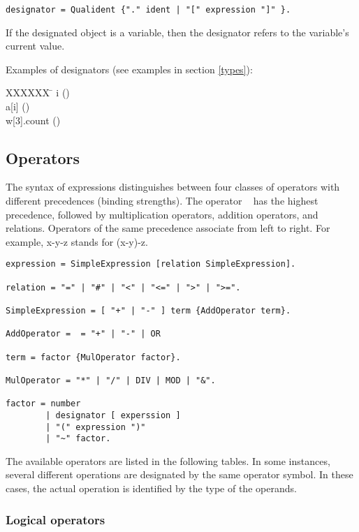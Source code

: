 \documentclass[12pt]{article}
\begin{document}
\begin{lstlisting}[style=ebnf]
designator = Qualident {"." ident | "[" expression "]" }.
\end{lstlisting}

If the designated object is a variable, then the designator refers to the variable's current value.

Examples of designators (see examples in section \ref{types}):

\begin{tabbing}
    XXXXXX \= \kill
    i \> (\INTEGER) \\
    a[i] \> (\INTEGER) \\
    w[3].count \> (\INTEGER) \\
\end{tabbing}

\subsection{Operators}
\label{operators}

The syntax of expressions distinguishes between four classes of operators with different precedences (binding strengths). The operator ~ has the highest precedence, followed by multiplication operators, addition operators, and relations. Operators of the same precedence associate from left to right. For example, x-y-z stands for (x-y)-z.

\begin{lstlisting}[style=ebnf]
expression = SimpleExpression [relation SimpleExpression]. 

relation = "=" | "#" | "<" | "<=" | ">" | ">=". 

SimpleExpression = [ "+" | "-" ] term {AddOperator term}.

AddOperator =  = "+" | "-" | OR

term = factor {MulOperator factor}.

MulOperator = "*" | "/" | DIV | MOD | "&".

factor = number 
        | designator [ experssion ] 
        | "(" expression ")" 
        | "~" factor. 
\end{lstlisting}

The available operators are listed in the following tables. In some instances, several different operations are designated by the same operator symbol. In these cases, the actual operation is identified by the type of the operands.

\subsubsection{Logical operators}
\end{document}
